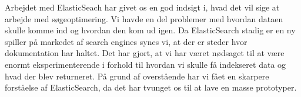 Arbejdet med ElasticSeach har givet os en god indsigt i, hvad det vil sige at arbejde med søgeoptimering.
Vi havde en del problemer med hvordan dataen skulle komme ind og hvordan den kom ud igen. 
Da ElasticSearch stadig er en ny spiller på markedet af search engines synes vi, at der er steder hvor dokumentation har haltet.
Det har gjort, at vi har været nødsaget til at være enormt eksperimenterende i forhold til hvordan vi skulle få indekseret data og hvad der blev returneret.
På grund af overstående har vi fået en skarpere forståelse af ElasticSearch, da det har tvunget os til at lave en masse prototyper.
